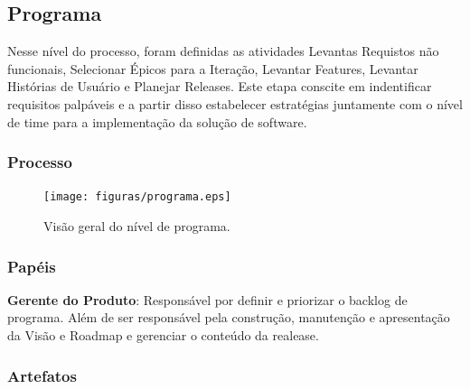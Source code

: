   \subsection{Programa}

  Nesse nível do processo, foram definidas as atividades Levantas Requistos não funcionais,
  Selecionar Épicos para a Iteração, Levantar Features, Levantar Histórias de Usuário e Planejar Releases.
  Este etapa conscite em indentificar requisitos palpáveis e a partir disso estabelecer estratégias
  juntamente com o nível de time para a implementação da solução de software.

  \subsubsection{Processo}

  \begin{figure}[H]
      \centering
    \texttt{[image: figuras/programa.eps]}
      \caption{Visão geral do nível de programa.}
      \label{fig:progama}
  \end{figure}

  \subsubsection{Papéis}

    \textbf{Gerente do Produto}: Responsável por definir e priorizar o backlog de programa.
    Além de ser responsável pela construção, manutenção e apresentação da Visão e Roadmap
    e gerenciar o conteúdo da realease.

  \subsubsection{Artefatos}

